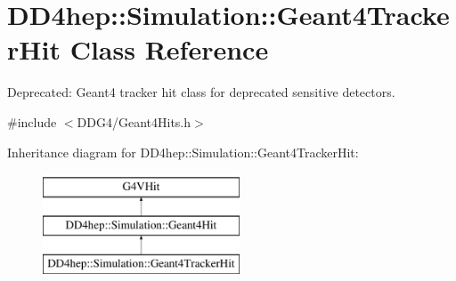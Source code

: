 \hypertarget{class_d_d4hep_1_1_simulation_1_1_geant4_tracker_hit}{}\section{D\+D4hep\+:\+:Simulation\+:\+:Geant4\+Tracker\+Hit Class Reference}
\label{class_d_d4hep_1_1_simulation_1_1_geant4_tracker_hit}


Deprecated\+: Geant4 tracker hit class for deprecated sensitive detectors.  




{\ttfamily \#include $<$D\+D\+G4/\+Geant4\+Hits.\+h$>$}

Inheritance diagram for D\+D4hep\+:\+:Simulation\+:\+:Geant4\+Tracker\+Hit\+:\begin{figure}[H]
\begin{center}
\leavevmode
\includegraphics[height=3.000000cm]{class_d_d4hep_1_1_simulation_1_1_geant4_tracker_hit}
\end{center}
\end{figure}

